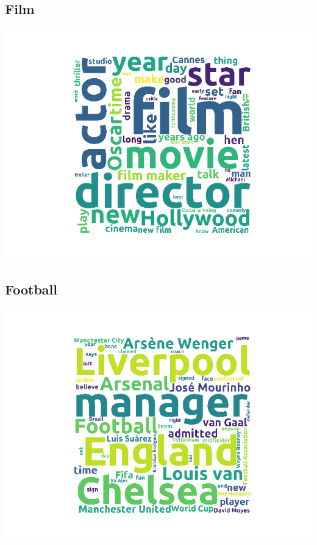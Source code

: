 \documentclass{article}
\begin{document}
\subsection*{\textlatin{Film}}
\includegraphics[scale=0.6]{Film}
\subsection*{\textlatin{Football}}
\includegraphics[scale=0.6]{Foot}
\end{document}
